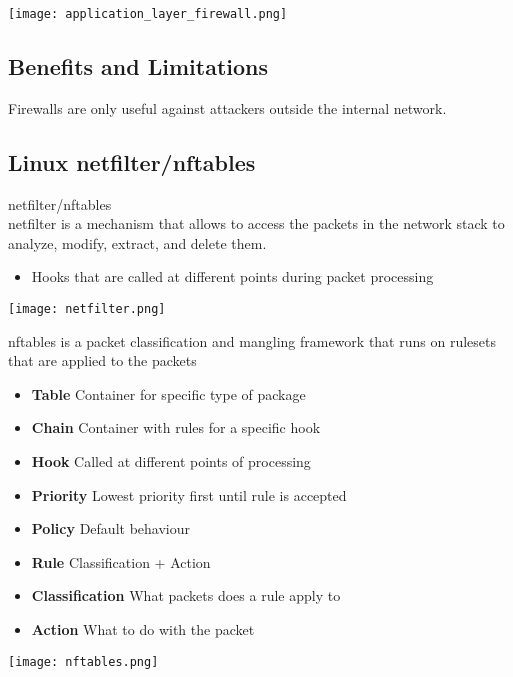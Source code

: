 \texttt{[image: application\_layer\_firewall.png]}

\subsection{Benefits and Limitations}

\begin{remark}
    Firewalls are only useful against attackers outside the internal network.
\end{remark}

\subsection{Linux netfilter/nftables}

\begin{definition}{netfilter/nftables}\\
    netfilter is a mechanism that allows to access the packets in the network stack to analyze, modify, extract, and delete them.
    \begin{itemize}
        \item Hooks that are called at different points during packet processing
    \end{itemize}
    \texttt{[image: netfilter.png]}
    
    nftables is a packet classification and mangling framework that runs on rulesets that are applied to the packets
    \begin{itemize}
        \item \textbf{Table} Container for specific type of package
        \item \textbf{Chain} Container with rules for a specific hook
        \item \textbf{Hook} Called at different points of processing
        \item \textbf{Priority} Lowest priority first until rule is accepted
        \item \textbf{Policy} Default behaviour
        \item \textbf{Rule} Classification + Action
        \item \textbf{Classification} What packets does a rule apply to
        \item \textbf{Action} What to do with the packet
    \end{itemize}
    \texttt{[image: nftables.png]}
\end{definition}



